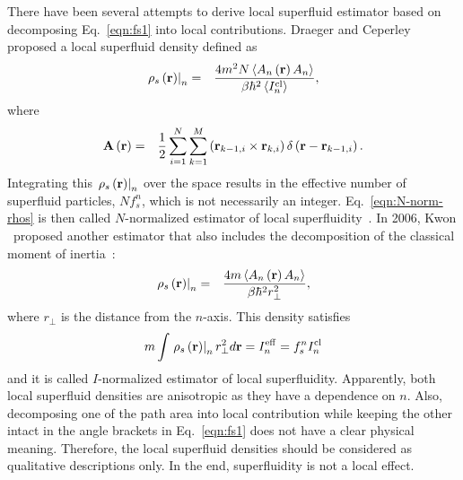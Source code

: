 \documentclass[12pt]{iopart}
\begin{document}
There have been several attempts to derive local superfluid estimator based on decomposing Eq.~\ref{eqn:fs1} into local contributions. Draeger and Ceperley proposed a local superfluid density defined as~\cite{rho_fs_draeger}
\begin{eqnarray}
\left.\rho_{s}\left(\bf r \right)\right|_{{n}}&=&\frac{4m^2N\left< A_n\left(\bf r \right)A_n \right>}{\beta\hbar^2\left< I^{\rm cl}_n\right>}, \label{eqn:N-norm-rhos}
\end{eqnarray}
where
\begin{eqnarray}
{\bf A}\left({\bf r} \right)&=&\frac{1}{2}\sum_{i=1}^N\sum_{k=1}^M\left( {\bf r}_{k-1,i} \times {\bf r}_{k,i}\right)\delta\left({\bf r}-{\bf r}_{k-1,i} \right).
\end{eqnarray}
Integrating this $\left.\rho_{s}\left(\bf r \right)\right|_{{n}}$ over the space results in the effective number of superfluid particles, $Nf_s^n$, which is not necessarily an integer. Eq.~\ref{eqn:N-norm-rhos} is then called $N$-normalized estimator of local superfluidity~\cite{rho_fs_kwon}. In 2006, Kwon \etal~proposed another estimator that also includes the decomposition of the classical moment of inertia~\cite{rho_fs_kwon}:
\begin{eqnarray}
\left.\rho_{s}\left(\bf r \right)\right|_{{n}}&=&\frac{4m\left< A_n\left(\bf r \right)A_n \right>}{\beta\hbar^2 r_{\perp}^2},
\end{eqnarray}
where $r_{\perp}$ is the distance from the $n$-axis. This density satisfies
\begin{eqnarray}
m\int \left.\rho_{s}\left(\bf r \right)\right|_{{n}} r_{\perp}^2 d{\bf r} = I^{\rm eff}_n=f_s^n I^{\rm cl}_n \label{eqn:I-norm-rhos}
\end{eqnarray}
and it is called $I$-normalized estimator of local superfluidity. Apparently, both local superfluid densities are anisotropic as they have a dependence on $n$. Also, decomposing one of the path area into local contribution while keeping the other intact in the angle brackets in Eq.~\ref{eqn:fs1} does not have a clear physical meaning. Therefore, the local superfluid densities should be considered as qualitative descriptions only. 
In the end, superfluidity is not a local effect.
\end{document}
